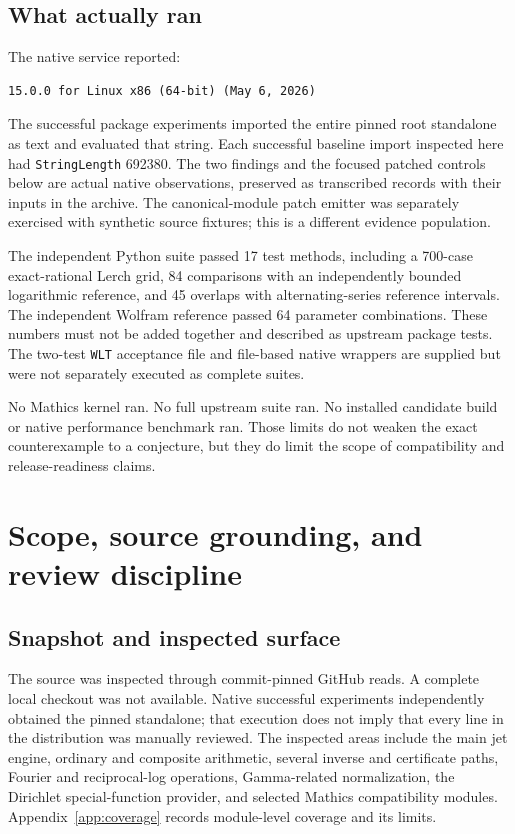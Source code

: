 \documentclass[11pt,a4paper]{article}
\begin{document}
\subsection{What actually ran}
The native service reported:
\begin{lstlisting}
15.0.0 for Linux x86 (64-bit) (May 6, 2026)
\end{lstlisting}
The successful package experiments imported the entire pinned root standalone as text and evaluated that string. Each successful baseline import inspected here had \texttt{StringLength} 692380. The two findings and the focused patched controls below are actual native observations, preserved as transcribed records with their inputs in the archive. The canonical-module patch emitter was separately exercised with synthetic source fixtures; this is a different evidence population.

The independent Python suite passed 17 test methods, including a 700-case exact-rational Lerch grid, 84 comparisons with an independently bounded logarithmic reference, and 45 overlaps with alternating-series reference intervals. The independent Wolfram reference passed 64 parameter combinations. These numbers must not be added together and described as upstream package tests. The two-test \texttt{WLT} acceptance file and file-based native wrappers are supplied but were not separately executed as complete suites.

No Mathics kernel ran. No full upstream suite ran. No installed candidate build or native performance benchmark ran. Those limits do not weaken the exact counterexample to a conjecture, but they do limit the scope of compatibility and release-readiness claims.

\section{Scope, source grounding, and review discipline}
\label{sec:scope}
\subsection{Snapshot and inspected surface}
The source was inspected through commit-pinned GitHub reads. A complete local checkout was not available. Native successful experiments independently obtained the pinned standalone; that execution does not imply that every line in the distribution was manually reviewed. The inspected areas include the main jet engine, ordinary and composite arithmetic, several inverse and certificate paths, Fourier and reciprocal-log operations, Gamma-related normalization, the Dirichlet special-function provider, and selected Mathics compatibility modules. Appendix~\ref{app:coverage} records module-level coverage and its limits.\cite{core,ops,arithmetic,envelope,dirichlet,mathics}
\end{document}
